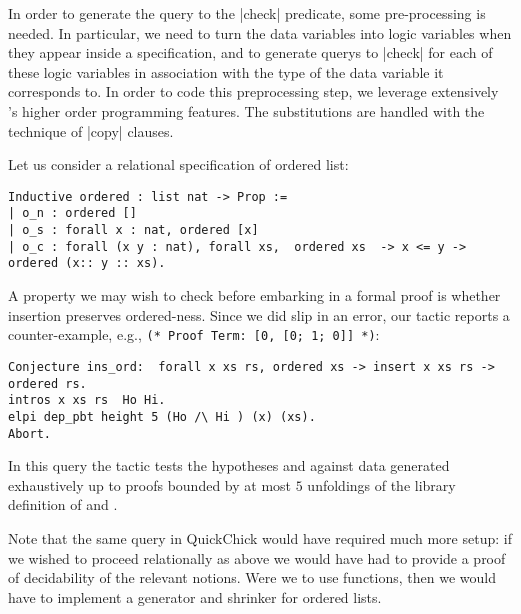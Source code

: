 In order to generate the query to the \lsti|check| predicate, some pre-processing is needed. In particular, we need to
turn the data variables into \lP logic variables when they appear inside a specification, and to generate querys to
\lsti|check| for each of these logic variables in association with the type of the data variable it corresponds to.
In order to code this preprocessing step, we leverage extensively \lP's higher order programming features. The substitutions
are handled with the technique of \lsti|copy| clauses.

Let us consider a  relational specification of ordered list:
\begin{lstlisting}
Inductive ordered : list nat -> Prop :=
| o_n : ordered []
| o_s : forall x : nat, ordered [x]
| o_c : forall (x y : nat), forall xs,  ordered xs  -> x <= y -> ordered (x:: y :: xs).     
\end{lstlisting}
%
A property we may wish to check before embarking in a formal proof is whether insertion preserves ordered-ness. Since we did slip in an error, our tactic reports a counter-example, e.g.,
\verb|(* Proof Term: [0, [0; 1; 0]] *)|:
\begin{lstlisting}
Conjecture ins_ord:  forall x xs rs, ordered xs -> insert x xs rs -> ordered rs.
intros x xs rs  Ho Hi.
elpi dep_pbt height 5 (Ho /\ Hi ) (x) (xs).
Abort.
\end{lstlisting}
In this query the tactic tests the hypotheses  and 
against data  generated exhaustively up to proofs bounded by
at most $5$ unfoldings of the library  definition of
 and .

Note that the same query in \textsf{QuickChick} would have required much more setup: if we wished to proceed relationally as above we would have had to provide a proof of decidability of the relevant notions. Were we to use functions, then we would have to implement a generator and shrinker for ordered lists.

